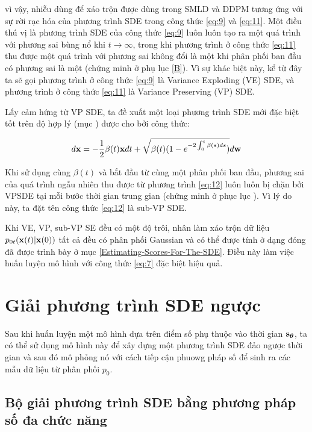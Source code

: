 \documentclass{article} %
\begin{document}
vì vậy, nhiễu dùng để xáo trộn được dùng trong SMLD và DDPM tương ứng với sự rời rạc hóa của phương trình SDE trong công thức \ref{eq:9} và \ref{eq:11}.
Một điều thú vị là phương trình SDE của công thức \ref{eq:9} luôn luôn tạo ra một quá trình với phương sai bùng nổ khi $t \rightarrow \infty$, trong khi phương trình ở công thức \ref{eq:11} thu được một quá trình với phương sai không đổi là một khi phân phối ban đầu có phương sai là một (chứng minh ở phụ lục \ref{B}).
Vì sự khác biệt này, kể từ đây ta sẽ gọi phương trình ở công thức \ref{eq:9} là Variance Exploding (VE) SDE, và phương trình ở công thức \ref{eq:11} là Variance Preserving (VP) SDE.

Lấy cảm hứng từ VP SDE, ta đề xuất một loại phương trình SDE mới đặc biệt tốt trên độ hợp lý (mục ) được cho bởi công thức:

\begin{equation} \label{eq:12}
    d \bold{x} = -\dfrac{1}{2} \beta(t) \bold{x} dt + \sqrt{\beta(t) (1-e^{-2\int_{0}^{t} \beta(s)ds} )} d \bold{w}
\end{equation}

Khi sử dụng cùng $\beta(t)$ và bắt đầu từ cùng một phân phối ban đầu, phương sai của quá trình ngẫu nhiên thu được từ phương trình \ref{eq:12} luôn luôn bị chặn bởi VPSDE tại mỗi bước thời gian trung gian (chứng minh ở phục lục ).
Vì lý do này, ta đặt tên công thức \ref{eq:12} là sub-VP SDE.

Khi VE, VP, sub-VP SE đều có một độ trôi, nhân làm xáo trộn dữ liệu $p_{0t}(\bold{x}(t) \vert \bold{x}(0))$ tất cả đều có phân phối Gaussian và có thể được tính ở dạng đóng đã được trình bày ở mục \ref{Estimating-Scores-For-The-SDE}.
Điều này làm việc huấn luyện mô hình với công thức \ref{eq:7} đặc biệt hiệu quả.

\section{Giải phương trình SDE ngược}

Sau khi huấn luyện một mô hình dựa trên điểm số phụ thuộc vào thời gian $\bold{s}_{\boldsymbol{\theta}}$, ta có thể sử dụng mô hình này để xây dựng một phương trình SDE đảo ngược thời gian và sau đó mô phỏng nó với cách tiếp cận phuowg pháp số để sinh ra các mẫu dữ liệu từ phân phối $p_0$.

\subsection{Bộ giải phương trình SDE bằng phương pháp số đa chức năng}
\end{document}
